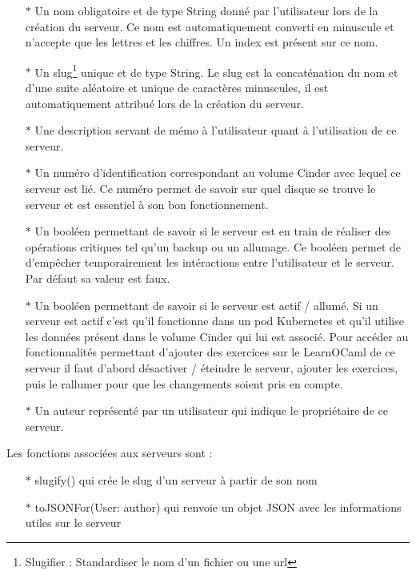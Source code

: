 \documentclass{article}
\begin{document}
\begin{itemize}
	\item[$\ast$]Un nom obligatoire et de type String donné par l'utilisateur lors de la création du serveur. Ce nom est automatiquement converti en minuscule et n'accepte que les lettres et les chiffres. Un index est présent sur ce nom.
	\item[$\ast$]Un slug\footnote{Slugifier : Standardiser le nom d'un fichier ou une url} unique et de type String. Le slug est la concaténation du nom et d'une suite aléatoire et unique de caractères minuscules, il est automatiquement attribué lors de la création du serveur.
	\item[$\ast$]Une description servant de mémo à l'utilisateur quant à l'utilisation de ce serveur.
	\item[$\ast$]Un numéro d'identification correspondant au volume Cinder avec lequel ce serveur est lié. Ce numéro permet de savoir sur quel disque se trouve le serveur et est essentiel à son bon fonctionnement.
	\item[$\ast$]Un booléen permettant de savoir si le serveur est en train de réaliser des opérations critiques tel qu'un backup ou un allumage. Ce booléen permet de d'empêcher temporairement les intéractions entre l'utilisateur et le serveur. Par défaut sa valeur est faux.
	\item[$\ast$]Un booléen permettant de savoir si le serveur est actif / allumé. Si un serveur est actif c'est qu'il fonctionne dans un pod Kubernetes et qu'il utilise les données présent dans le volume Cinder qui lui est associé. Pour accéder au fonctionnalités permettant d'ajouter des exercices sur le LearnOCaml de ce serveur il faut d'abord désactiver / éteindre le serveur, ajouter les exercices, puis le rallumer pour que les changements soient pris en compte.
	\item[$\ast$]Un auteur représenté par un utilisateur qui indique le propriétaire de ce serveur.
\end{itemize}
Les fonctions associées aux serveurs sont :
\begin{itemize}
	\item[$\ast$]slugify() qui crée le slug d'un serveur à partir de son nom
	\item[$\ast$]toJSONFor(User: author) qui renvoie un objet JSON avec les informations utiles sur le serveur
\end{itemize}

\newpage
\end{document}

